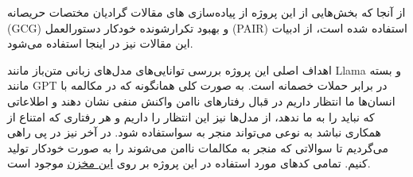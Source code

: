 
از آنجا که بخش‌هایی از این پروژه از پیاده‌سازی های مقالات گرادیان مختصات حریصانه (GCG)  و بهبود تکرارشونده خودکار دستورالعمل (PAIR)  استفاده شده است، از ادبیات این مقالات نیز در اینجا استفاده می‌شود.


اهداف اصلی این پروژه بررسی توانایی‌های مدل‌های زبانی متن‌باز مانند Llama و بسته مانند GPT در برابر حملات خصمانه است.
به صورت کلی همانگونه که در مکالمه با انسان‌ها ما انتظار داریم در قبال رفتارهای ناامن واکنش منفی نشان دهند و اطلاعاتی که نباید را به ما ندهد، از مدل‌ها نیز این انتظار را داریم و هر رفتاری که امتناع از همکاری نباشد به نوعی می‌تواند منجر به سواستفاده شود.
در آخر نیز در پی راهی می‌گردیم تا سوالاتی که منجر به مکالمات ناامن می‌شوند را به صورت خودکار تولید کنیم.
تمامی کدهای مورد استفاده در این پروژه بر روی \href{https://github.com/AlisaLC/llama-attack}{این مخزن} موجود است.